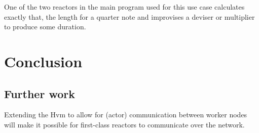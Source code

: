 \documentclass[a4paper]{book}
\begin{document}
One of the two reactors in the main program used for this use case calculates exactly that, the length for a quarter note and improvises a deviser or multiplier to produce some duration. 

\chapter{Conclusion}



\section{Further work}
Extending the Hvm to allow for (actor) communication between worker nodes will make it possible for first-class reactors to communicate over the network. 

\printbibliography
\end{document}
